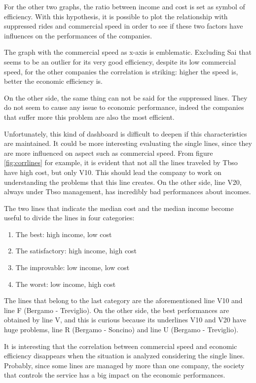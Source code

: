 For the other two graphs, the ratio between income and cost is set as symbol of efficiency. With this hypothesis, it is possible to plot the relationship with suppressed rides and commercial speed in order to see if these two factors have influences on the performances of the companies. 

The graph with the commercial speed as x-axis is emblematic. Excluding Sai that seems to be an outlier for its very good efficiency, despite its low commercial speed, for the other companies the correlation is striking: higher the speed is, better the economic efficiency is. 

On the other side, the same thing can not be said for the suppressed lines. They do not seem to cause any issue to economic performance, indeed the companies that suffer more this problem are also the most efficient.

Unfortunately, this kind of dashboard is difficult to deepen if this characteristics are maintained. It could be more interesting evaluating the single lines, since they are more influenced on aspect such as commercial speed. From figure \ref{fig:corrlines} for example, it is evident that not all the lines traveled by Tbso have high cost, but only V10. This should lead the company to work on understanding the problems that this line creates. On the other side, line V20, always under Tbso management, has incredibly bad performances about incomes. 

The two lines that indicate the median cost and the median income become useful to divide the lines in four categories:
\begin{enumerate}
\item The best: high income, low cost
\item The satisfactory: high income, high cost
\item The improvable: low income, low cost
\item The worst: low income, high cost
\end{enumerate}
The lines that belong to the last category are the aforementioned line V10 and line F (Bergamo - Treviglio). 
On the other side, the best performances are obtained by line V, and this is curious because its underlines V10 and V20 have huge problems, line R (Bergamo - Soncino) and line U (Bergamo - Treviglio). 

It is interesting that the correlation between commercial speed and economic efficiency disappears when the situation is analyzed considering the single lines. Probably, since some lines are managed by more than one company, the society that controls the service has a big impact on the economic performances.

